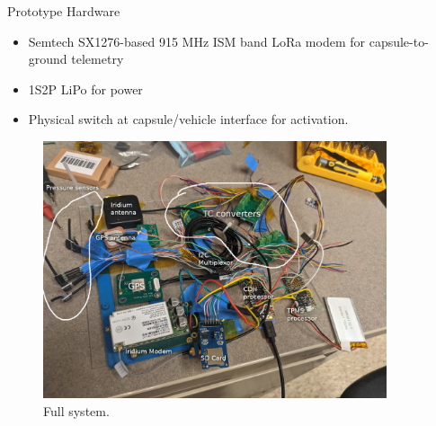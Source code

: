 \documentclass[UKenglish]{beamer}
\begin{document}
\begin{frame}[allowframebreaks]{Prototype Hardware}
	\begin{itemize}
		\item Semtech SX1276-based 915 MHz ISM band LoRa modem for capsule-to-ground telemetry
		\item 1S2P LiPo for power
		\item Physical switch at capsule/vehicle interface for activation.
	\end{itemize}
	
	\begin{figure}[h!]
		\centering
		\includegraphics[width=0.9\textwidth]{images/subsystem-hardware-annotated.png}
		\caption{Full system.}
	\end{figure}

	
\end{frame}
\end{document}
